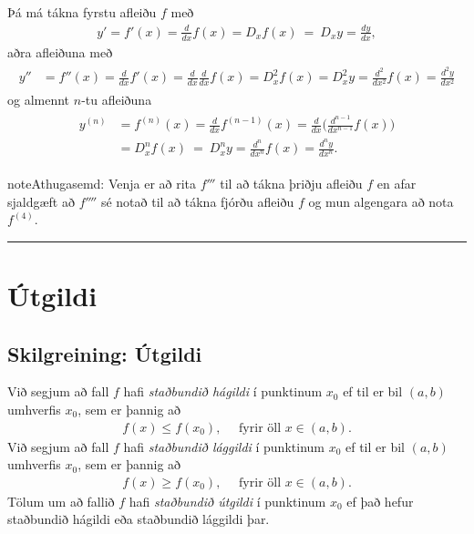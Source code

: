 \documentclass[a4paper,10pt,icelandic]{sphinxmanual}
\begin{document}
Þá má tákna fyrstu afleiðu \(f\) með
\begin{equation*}
\begin{split}y'= f'(x)=\frac{d}{dx}f(x)=D_xf(x)\ =\ D_x y= \frac{dy}{dx},\end{split}
\end{equation*}
aðra afleiðuna með
\begin{equation*}
\begin{split}\begin{aligned}
y'' &=
f''(x)=\frac{d}{dx}f'(x)=\frac{d}{dx}\frac{d}{dx}f(x)
= D^2_xf(x)= D^2_x y=\frac{d^2}{dx^2}f(x)=\frac{d^2 y}{dx^2}\end{aligned}\end{split}
\end{equation*}
og almennt \(n\)-tu afleiðuna
\begin{equation*}
\begin{split}\begin{aligned}
y^{(n)} &= f^{(n)}(x)=\frac{d}{dx}f^{(n-1)}(x)=
\frac{d}{dx}\Big(\frac{d^{n-1}}{dx^{n-1}}f(x)\Big) \\
&=D^n_xf(x)\ =\ D^n_x y
=\frac{d^n}{dx^n}f(x)
= \frac{d^n y}{dx^n}.\end{aligned}\end{split}
\end{equation*}
\begin{notice}{note}{Athugasemd:}
Venja er að rita \(f'''\) til að tákna þriðju afleiðu \(f\) en
afar sjaldgæft að \(f''''\) sé notað til að tákna fjórðu afleiðu
\(f\) og mun algengara að nota \(f^{(4)}\).
\end{notice}


\bigskip\hrule{}\bigskip



\section{Útgildi}
\label{kafli03:utgildi}\label{kafli03:id10}

\subsection{Skilgreining: Útgildi}
\label{kafli03:index-5}\label{kafli03:skilgreining-utgildi}
Við segjum að fall \(f\) hafi \textit{staðbundið hágildi} í punktinum
\(x_0\) ef til er bil \((a,b)\) umhverfis \(x_0\), sem er
þannig að
\begin{equation*}
\begin{split}f(x) \leq f(x_0), \quad \text{ fyrir öll } x \in (a,b).\end{split}
\end{equation*}
Við segjum að fall \(f\) hafi \textit{staðbundið lággildi} í punktinum
\(x_0\) ef til er bil \((a,b)\) umhverfis \(x_0\), sem er
þannig að
\begin{equation*}
\begin{split}f(x) \geq f(x_0), \quad \text{ fyrir öll } x \in (a,b).\end{split}
\end{equation*}
Tölum um að fallið \(f\) hafi \textit{staðbundið útgildi} í punktinum
\(x_0\) ef það hefur staðbundið hágildi eða staðbundið lággildi þar.
\end{document}
